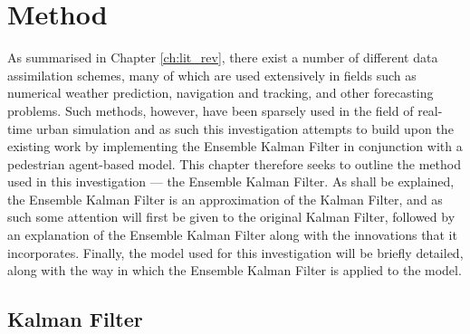 \chapter{Method}\label{ch:method}

As summarised in Chapter \ref{ch:lit_rev}, there exist a number of different
data assimilation schemes, many of which are used extensively in fields such as
numerical weather prediction, navigation and tracking, and other forecasting
problems.
Such methods, however, have been sparsely used in the field of real-time urban
simulation and as such this investigation attempts to build upon the existing
work by implementing the Ensemble Kalman Filter in conjunction with a pedestrian
agent-based model.
This chapter therefore seeks to outline the method used in this investigation --- the
Ensemble Kalman Filter. 
As shall be explained, the Ensemble Kalman Filter is an approximation of the
Kalman Filter, and as such some attention will first be given to the original
Kalman Filter, followed by an explanation of the Ensemble Kalman Filter along
with the innovations that it incorporates.
Finally, the model used for this investigation will be briefly detailed, along
with the way in which the Ensemble Kalman Filter is applied to the model.

\section{Kalman Filter}\label{sec:method:kf}

